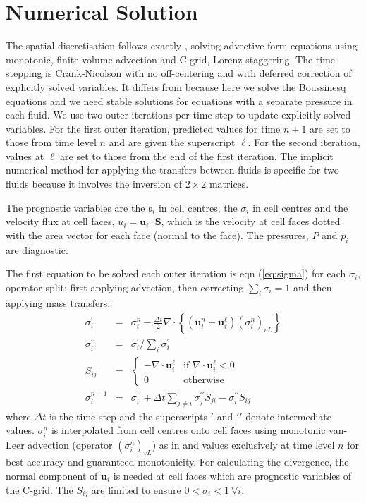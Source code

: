 \documentclass[draft]{agujournal2019}
\begin{document}
\section{Numerical Solution \label{sec:numerics}}

The spatial discretisation follows exactly , solving
advective form equations using monotonic, finite volume advection
and C-grid, Lorenz staggering. The time-stepping is Crank-Nicolson
with no off-centering and with deferred correction of explicitly solved
variables. It differs from  because here we solve the
Boussinesq equations and we need stable solutions for equations with
a separate pressure in each fluid. We use two outer iterations per
time step to update explicitly solved variables. For the first outer
iteration, predicted values for time $n+1$ are set to those from
time level $n$ and are given the superscript $\ell$. For the second
iteration, values at $\ell$ are set to those from the end of the
first iteration. The implicit numerical method for applying the transfers
between fluids is specific for two fluids because it involves the
inversion of $2\times2$ matrices. 

The prognostic variables are the $b_{i}$ in cell centres, the $\sigma_{i}$
in cell centres and the velocity flux at cell faces, $u_{i}=\mathbf{u}_{i}\cdot\mathbf{S}$,
which is the velocity at cell faces dotted with the area vector for
each face (normal to the face). The pressures, $P$ and $p_{i}$ are
diagnostic.

The first equation to be solved each outer iteration is eqn (\ref{eq:sigma})
for each $\sigma_{i}$, operator split; first applying advection,
then correcting $\sum_{i}\sigma_{i}=1$ and then applying mass transfers:
\begin{eqnarray}
\sigma_{i}^{\prime} & = & \sigma_{i}^{n}-\frac{\Delta t}{2}\nabla\cdot\left\{ \left(\mathbf{u}_{i}^{n}+\mathbf{u}_{i}^{\ell}\right)\left(\sigma_{i}^{n}\right)_{vL}\right\} \\
\sigma_{i}^{\prime\prime} & = & \sigma_{i}^{\prime}\bigg/\sum_{i}\sigma_{i}^{\prime}\\
S_{ij} & = & \begin{cases}
-\nabla\cdot\mathbf{u}_{i}^{\ell} & \text{if }\nabla\cdot\mathbf{u}_{i}^{\ell}<0\\
0 & \text{otherwise}
\end{cases}\\
\sigma_{i}^{n+1} & = & \sigma_{i}^{\prime\prime}+\Delta t\sum_{j\ne i}\sigma_{j}^{\prime\prime}S_{ji}-\sigma_{i}^{\prime\prime}S_{ij}
\end{eqnarray}
where $\Delta t$ is the time step and the superscripts $\prime$
and $\prime\prime$ denote intermediate values. $\sigma_{i}^{n}$
is interpolated from cell centres onto cell faces using monotonic
van-Leer advection (operator $(\sigma_{i}^{n})_{vL}$) as in 
and values exclusively at time level $n$ for best accuracy and guaranteed
monotonicity. For calculating the divergence, the normal component
of $\mathbf{u}_{i}$ is needed at cell faces which are prognostic
variables of the C-grid. The $S_{ij}$ are limited to ensure $0<\sigma_{i}<1\ \forall i$. 
\end{document}
